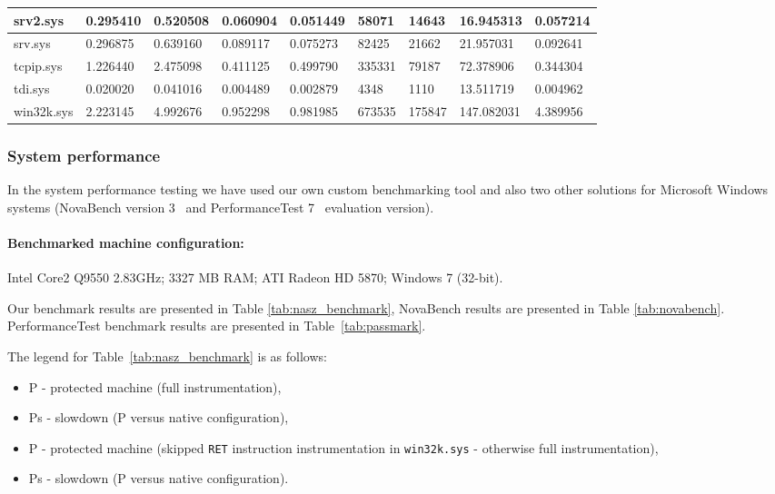\documentclass[10pt,twocolumn,a4paper]{article}
\begin{document}
\begin{table*}[!ht]
\begin{tabular}{|p{1.75cm}|p{1.3cm}|p{1.3cm}|p{1.4cm}|p{1.45cm}|p{1.60cm}|p{1.55cm}|p{1.7cm}|p{1.35cm}|}
    \hline
    srv2.sys & 0.295410 & 0.520508 & 0.060904 & 0.051449 & 58071 & 14643 & 16.945313 & 0.057214 \\
    \hline
    srv.sys & 0.296875 & 0.639160 & 0.089117  & 0.075273 & 82425 & 21662 & 21.957031  & 0.092641 \\
    \hline
    tcpip.sys & 1.226440  & 2.475098 & 0.411125 & 0.499790 & 335331 & 79187 & 72.378906 & 0.344304 \\
    \hline
    tdi.sys & 0.020020 & 0.041016 & 0.004489 & 0.002879 & 4348  & 1110  & 13.511719 & 0.004962 \\
    \hline
    win32k.sys & 2.223145 & 4.992676 & 0.952298 & 0.981985 & 673535 & 175847 & 147.082031 & 4.389956 \\
    \bottomrule
    \end{tabular}\label{tab:tabela_int}\end{table*}

\subsubsection{System performance}


In the system performance testing we have used our own custom benchmarking tool and also two other solutions for Microsoft Windows systems (NovaBench version 3~\cite{BenchmarkNova} and PerformanceTest 7~ \cite{BenchmarkPassmark} evaluation version).

\paragraph{Benchmarked machine configuration:}Intel Core2 Q9550 2.83GHz; 3327 MB RAM; ATI Radeon HD 5870; Windows 7 (32-bit).\newline

Our benchmark results are presented in Table \ref{tab:nasz_benchmark}, NovaBench results are presented in Table \ref{tab:novabench}. PerformanceTest benchmark results are presented in Table~\ref{tab:passmark}.\newline

The legend for Table~\ref{tab:nasz_benchmark} is as follows:
\begin{itemize}
    \item P - protected machine (full instrumentation),
    \item Ps - slowdown (P versus native configuration),
    \item P - protected machine (skipped {\tt{RET}} instruction instrumentation in {\tt{win32k.sys}} - otherwise full instrumentation),
    \item Ps - slowdown (P versus native configuration).
\end{itemize}
\end{document}
